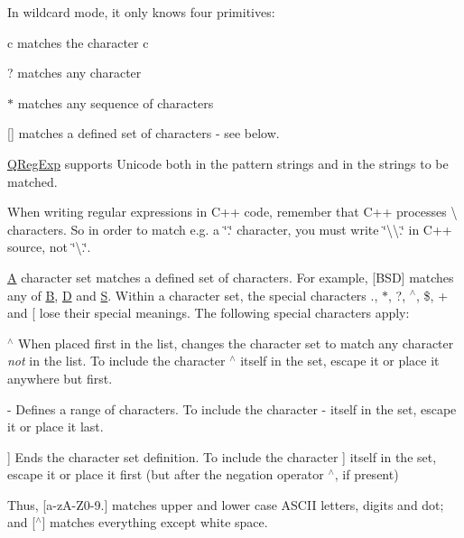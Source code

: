In wildcard mode, it only knows four primitives\+: 
\begin{DoxyItemize}
\item {\ttfamily c} matches the character \textquotesingle{}c\textquotesingle{} 
\item {\ttfamily ?} matches any character 
\item {\ttfamily $\ast$} matches any sequence of characters 
\item {\ttfamily \mbox{[}\mbox{]}} matches a defined set of characters -\/ see below. 
\end{DoxyItemize}

\hyperlink{class_q_reg_exp}{Q\+Reg\+Exp} supports Unicode both in the pattern strings and in the strings to be matched.

When writing regular expressions in C++ code, remember that C++ processes \textbackslash{} characters. So in order to match e.\+g. a \char`\"{}.\char`\"{} character, you must write \char`\"{}\textbackslash{}\textbackslash{}.\char`\"{} in C++ source, not \char`\"{}\textbackslash{}.\char`\"{}.

\hyperlink{class_a}{A} character set matches a defined set of characters. For example, \mbox{[}B\+S\+D\mbox{]} matches any of \textquotesingle{}\hyperlink{class_b}{B}\textquotesingle{}, \textquotesingle{}\hyperlink{class_d}{D}\textquotesingle{} and \textquotesingle{}\hyperlink{struct_s}{S}\textquotesingle{}. Within a character set, the special characters \textquotesingle{}.\textquotesingle{}, \textquotesingle{}$\ast$\textquotesingle{}, \textquotesingle{}?\textquotesingle{}, \textquotesingle{}$^\wedge$\textquotesingle{}, \textquotesingle{}\$\textquotesingle{}, \textquotesingle{}+\textquotesingle{} and \textquotesingle{}\mbox{[}\textquotesingle{} lose their special meanings. The following special characters apply\+: 
\begin{DoxyItemize}
\item {\ttfamily $^\wedge$} When placed first in the list, changes the character set to match any character {\itshape not} in the list. To include the character \textquotesingle{}$^\wedge$\textquotesingle{} itself in the set, escape it or place it anywhere but first. 
\item {\ttfamily -\/} Defines a range of characters. To include the character \textquotesingle{}-\/\textquotesingle{} itself in the set, escape it or place it last. 
\item {\ttfamily \mbox{]}} Ends the character set definition. To include the character \textquotesingle{}\mbox{]}\textquotesingle{} itself in the set, escape it or place it first (but after the negation operator \textquotesingle{}$^\wedge$\textquotesingle{}, if present) 
\end{DoxyItemize}Thus, \mbox{[}a-\/z\+A-\/\+Z0-\/9.\mbox{]} matches upper and lower case A\+S\+C\+I\+I letters, digits and dot; and \mbox{[}$^\wedge$\mbox{]} matches everything except white space.

